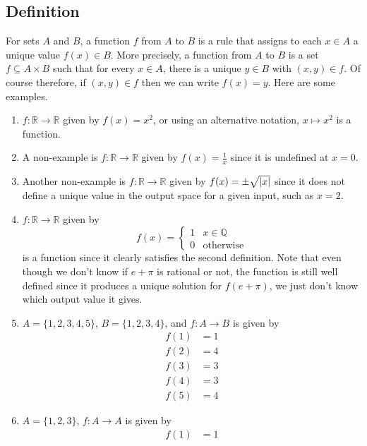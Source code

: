 \subsection{Definition}
For sets \(A\) and \(B\), a function \(f\) from \(A\) to \(B\) is a rule that assigns to each \(x \in A\) a unique value \(f(x) \in B\).
More precisely, a function from \(A\) to \(B\) is a set \(f \subseteq A \times B\) such that for every \(x \in A\), there is a unique \(y \in B\) with \((x, y) \in f\).
Of course therefore, if \((x, y) \in f\) then we can write \(f(x) = y\).
Here are some examples.
\begin{enumerate}
	\item \(f\colon \mathbb R \to \mathbb R\) given by \(f(x) = x^2\), or using an alternative notation, \(x \mapsto x^2\) is a function.
	\item A non-example is \(f\colon \mathbb R \to \mathbb R\) given by \(f(x) = \frac{1}{x}\) since it is undefined at \(x=0\).
	\item Another non-example is \(f\colon \mathbb R \to \mathbb R\) given by \(f(x) = \pm \sqrt{\abs{x}}\) since it does not define a unique value in the output space for a given input, such as \(x=2\).
	\item \(f\colon \mathbb R \to \mathbb R\) given by
	      \[
		      f(x) = \begin{cases}
			      1 & x \in \mathbb Q  \\
			      0 & \text{otherwise}
		      \end{cases}
	      \]
	      is a function since it clearly satisfies the second definition.
	      Note that even though we don't know if \(e + \pi\) is rational or not, the function is still well defined since it produces a unique solution for \(f(e + \pi)\), we just don't know which output value it gives.
	\item \(A = \{ 1, 2, 3, 4, 5 \}\), \(B = \{ 1, 2, 3, 4 \}\), and \(f\colon A \to B\) is given by
	      \begin{align*}
		      f(1) & = 1 \\
		      f(2) & = 4 \\
		      f(3) & = 3 \\
		      f(4) & = 3 \\
		      f(5) & = 4
	      \end{align*}
	\item \(A = \{ 1, 2, 3 \}\), \(f\colon A \to A\) is given by
	      \begin{align*}
		      f(1) & = 1 \\

\end{align*}
\end{enumerate}
